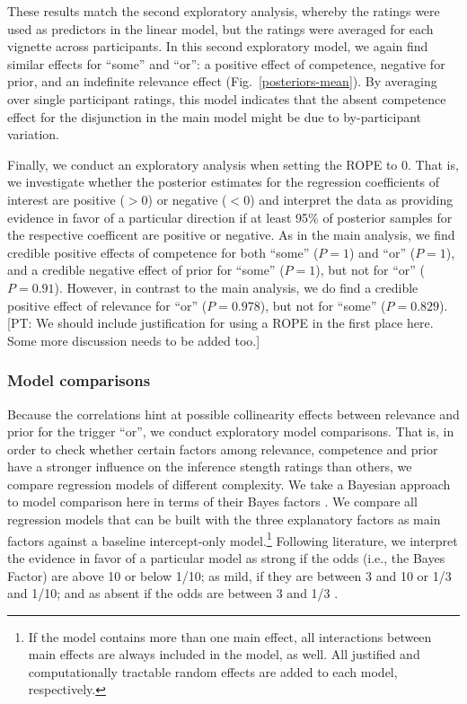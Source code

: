 \documentclass{sp}
\newcommand{\pt}[1]{\textcolor{Cerulean}{[PT: #1]}}
\begin{document}
These results match the second exploratory analysis, whereby the ratings were used as predictors in the linear model, but the ratings were averaged for each vignette across participants. In this second  exploratory model, we again find similar effects for ``some'' and ``or'': a positive effect of competence, negative for prior, and an indefinite relevance effect (Fig.~\ref{posteriors-mean}). By averaging over single participant ratings, this model indicates that the absent competence effect for the disjunction in the main model might be due to by-participant variation.


Finally, we conduct an exploratory analysis when setting the ROPE to 0. That is, we investigate whether the posterior estimates for the regression coefficients of interest are positive ($>0$) or negative ($<0$) and interpret the data as providing evidence in favor of a particular direction if at least 95\% of posterior samples for the respective coefficent are positive or negative. As in the main analysis, we find credible positive effects of competence for both ``some'' ($P = 1$) and ``or'' ($P = 1$), and a credible negative effect of prior for ``some'' ($P = 1$), but not for ``or'' ($P=0.91$). However, in contrast to the main analysis, we do find a credible positive effect of relevance for ``or'' ($P=0.978$), but not for ``some'' ($P=0.829$). \pt{We should include justification for using a ROPE in the first place here. Some more discussion needs to be added too.} 

\subsubsection{Model comparisons}
Because the correlations hint at possible collinearity effects between relevance and prior for the trigger ``or'', we conduct exploratory model comparisons. That is, in order to check whether certain factors among relevance, competence and prior have a stronger influence on the inference stength ratings than others, we compare regression models of different complexity. We take a Bayesian approach to model comparison here in terms of their Bayes factors \citep{rouder2012default}.
We compare all regression models that can be built with the three explanatory factors as main factors against a baseline intercept-only model.\footnote{If the model contains more than one main effect, all interactions between main effects are always included in the model, as well. All justified and computationally tractable random effects are added to each model, respectively.}
Following literature, we interpret the evidence in favor of a particular model as strong if the odds (i.e., the Bayes Factor) are above 10 or below 1/10; as mild, if they are between 3 and 10 or 1/3 and 1/10; and as absent if the odds are between 3 and 1/3 \citep[e.g.,][]{lodewyckx2011tutorial}. 
\end{document}
